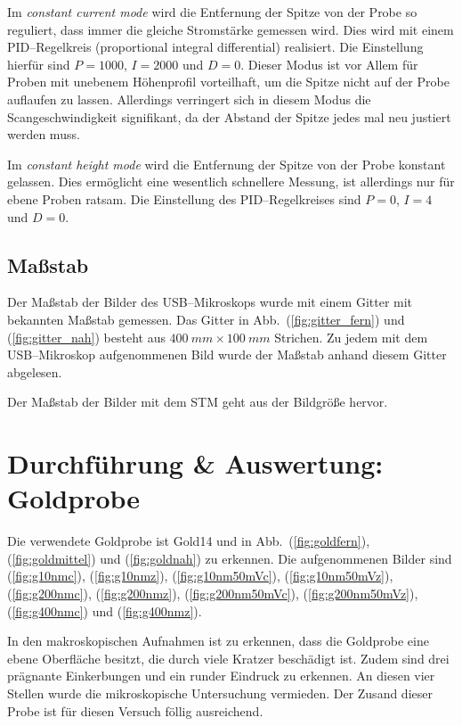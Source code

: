 \documentclass[sn-mathphys-num,iicol]{sn-jnl}
\theoremstyle{thmstyleone}
\theoremstyle{thmstyletwo}
\theoremstyle{thmstylethree}
\begin{document}
Im \textit{constant current mode} wird die Entfernung der Spitze von der Probe so reguliert, dass immer die gleiche Stromstärke gemessen wird.
Dies wird mit einem PID--Regelkreis (proportional integral differential) realisiert.
Die Einstellung hierfür sind $P=1000$, $I=2000$ und $D=0$.
Dieser Modus ist vor Allem für Proben mit unebenem Höhenprofil vorteilhaft, um die Spitze nicht auf der Probe auflaufen zu lassen.
Allerdings verringert sich in diesem Modus die Scangeschwindigkeit signifikant, da der Abstand der Spitze jedes mal neu justiert werden muss.

Im \textit{constant height mode} wird die Entfernung der Spitze von der Probe konstant gelassen.
Dies ermöglicht eine wesentlich schnellere Messung, ist allerdings nur für ebene Proben ratsam.
Die Einstellung des PID--Regelkreises sind $P=0$, $I=4$ und $D=0$.

\subsection{Maßstab}
Der Maßstab der Bilder des USB--Mikroskops wurde mit einem Gitter mit bekannten Maßstab gemessen.
Das Gitter in Abb.\ (\ref{fig:gitter_fern}) und (\ref{fig:gitter_nah}) besteht aus $\SI{400}{mm}\times \SI{100}{mm}$ Strichen.
Zu jedem mit dem USB--Mikroskop aufgenommenen Bild wurde der Maßstab anhand diesem Gitter abgelesen.

Der Maßstab der Bilder mit dem STM geht aus der Bildgröße hervor.

\section{Durchführung \& Auswertung:\\Goldprobe}
Die verwendete Goldprobe ist \glqq Gold14\grqq{} und in Abb.\ (\ref{fig:goldfern}), (\ref{fig:goldmittel}) und (\ref{fig:goldnah}) zu erkennen.
Die aufgenommenen Bilder sind (\ref{fig:g10nmc}), (\ref{fig:g10nmz}), (\ref{fig:g10nm50mVc}), (\ref{fig:g10nm50mVz}), (\ref{fig:g200nmc}), (\ref{fig:g200nmz}), (\ref{fig:g200nm50mVc}), (\ref{fig:g200nm50mVz}), (\ref{fig:g400nmc}) und (\ref{fig:g400nmz}).

In den makroskopischen Aufnahmen ist zu erkennen, dass die Goldprobe eine ebene Oberfläche besitzt, die durch viele Kratzer beschädigt ist.
Zudem sind drei prägnante Einkerbungen und ein runder Eindruck zu erkennen.
An diesen vier Stellen wurde die mikroskopische Untersuchung vermieden. %
Der Zusand dieser Probe ist für diesen Versuch föllig ausreichend. %
\end{document}
